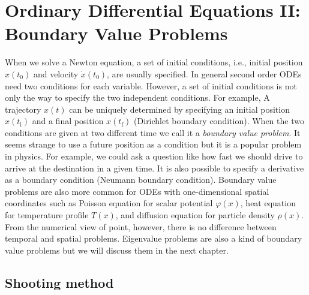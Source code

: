 \chapter{Ordinary Differential Equations II: Boundary Value Problems}\label{ch:ode-boundary}
 
When we solve a Newton equation, a set of initial conditions, i.e.,  initial position $x(t_0)$ and velocity $\dot{x}(t_0)$, are usually specified. In general second order ODEs need two conditions for each variable.  However, a set of initial conditions is not only the way to specify the two independent conditions.  For example, A trajectory $x(t)$ can be uniquely determined by specifying an initial position $x(t_\text{i})$ and a final position $x(t_\text{f})$ (Dirichlet boundary condition). When the two conditions are given at two different time we call it a \emph{boundary value problem}.  It seems strange to use a future position as a condition but it is a popular problem in physics. For example, we could ask a question like how fast we should drive to arrive at the destination in a given time. It is also possible to specify a derivative as a boundary condition (Neumann boundary condition). Boundary value problems are also more common for ODEs with one-dimensional spatial coordinates such as Poisson equation for scalar potential $\varphi(x)$, heat equation for temperature profile $T(x)$, and diffusion equation for particle density $\rho(x)$.   From the numerical view of point, however, there is no difference between temporal and spatial problems.
Eigenvalue problems are also a kind of boundary value problems but we will discuss them in the next chapter.

\section{Shooting method}

